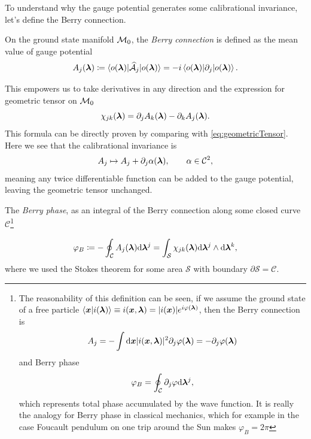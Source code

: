 To understand why the gauge potential generates some calibrational invariance, let's define the Berry connection.
\begin{definition}    
    On the ground state manifold $\mathcal{M}_0$, the \emph{Berry connection} is defined as the mean value of gauge potential
    \begin{equation}
        A_j({\bm\lambda})\coloneqq \braket{o({\bm\lambda})|\mathcal{\widehat{A}}_j|o({\bm\lambda})}= -i \braket{o({\bm\lambda})|\partial_j|o({\bm\lambda})}.
        \label{eq:berryConnection}
    \end{equation}
\end{definition}
    

This empowers us to take derivatives in any direction and the expression for geometric tensor on $\mathcal{M}_0$
\begin{equation}
    \chi_{jk}({\bm\lambda}) = \partial_j A_k({\bm\lambda})-\partial_k A_j({\bm\lambda})
    \label{eq:geometricTensorRedef}.
\end{equation}
This formula can be directly proven by comparing with \ref{eq:geometricTensor}. Here we see that the calibrational invariance is 
\begin{equation}
    A_j \mapsto A_j+\partial_j \alpha({\bm\lambda}),\qquad \alpha\in\mathcal C^2,
\end{equation}
meaning any twice differentiable function can be added to the gauge potential, leaving the geometric tensor unchanged.

\begin{definition}
    
    The \emph{Berry phase}, as an integral of the Berry connection along some closed curve $\mathcal{C}$\footnote{
        The reasonability of this definition can be seen, if we assume the ground state of a free particle
        $\braket{\bm{x}|i({\bm\lambda})}\equiv i(\bm{x},{\bm\lambda})= |i(\bm{x})|e^{i\varphi({\bm\lambda})}$,
        then the Berry connection is
        \begin{equation}
            A_j=-\int \mathrm{d} \bm{x}|i(\bm{x},{\bm\lambda})|^2\partial_j \varphi({\bm\lambda}) = -\partial_j \varphi({\bm\lambda})
        \end{equation} 
        and Berry phase
        \begin{equation}
            \varphi_B=\oint_\mathcal{C} \partial_j \varphi \mathrm{d} {\bm\lambda}^j,
        \end{equation}
        which represents total phase accumulated by the wave function. It is really the analogy for Berry phase in classical mechanics, which for example in the case Foucault pendulum on one trip around the Sun makes $\varphi_B=2\pi$
        }

    \begin{equation}
        \varphi_B\coloneqq-\oint_\mathcal{C} A_j({\bm\lambda})\mathrm{d} {\bm\lambda}^j=\int_\mathcal{S} \chi_{jk}({\bm\lambda})\mathrm{d} {\bm\lambda}^j \wedge \mathrm{d}{\bm\lambda}^k,
    \end{equation}
    where we used the Stokes theorem for some area $\mathcal{S}$ with boundary $\partial\mathcal{S}=\mathcal{C}$.    
    
\end{definition}

